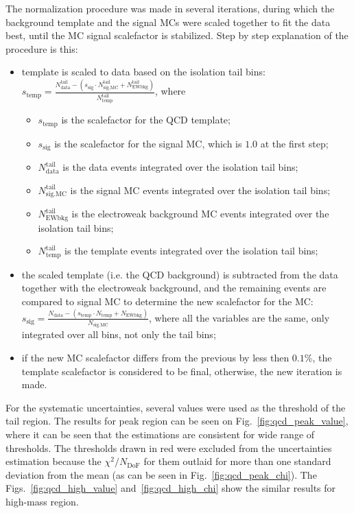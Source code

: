 The normalization procedure was made in several iterations, during which the background template and the signal MCs were scaled together to fit the data best, until the MC signal scalefactor is stabilized. Step by step explanation of the procedure is this:
\begin{itemize}
\item template is scaled to data based on the isolation tail bins: $s_{\mathrm{temp}} = \frac{N_{\mathrm{data}}^{\mathrm{tail}} - (s_{\mathrm{sig}} \cdot N_{\mathrm{sig.MC}}^{\mathrm{tail}}+N_{\mathrm{EWbkg}}^{\mathrm{tail}})}{N_{\mathrm{temp}}^{\mathrm{tail}}}$, where
\begin{itemize}
\item $s_{\mathrm{temp}}$ is the scalefactor for the QCD template;
\item $s_{\mathrm{sig}}$ is the scalefactor for the signal MC, which is $1.0$ at the first step;
\item $N_{\mathrm{data}}^{\mathrm{tail}}$ is the data events integrated over the isolation tail bins;
\item $N_{\mathrm{sig.MC}}^{\mathrm{tail}}$ is the signal MC events integrated over the isolation tail bins;
\item $N_{\mathrm{EWbkg}}^{\mathrm{tail}}$ is the electroweak background MC events integrated over the isolation tail bins;
\item $N_{\mathrm{temp}}^{\mathrm{tail}}$ is the template events integrated over the isolation tail bins;
\end{itemize}
\item the scaled template (i.e. the QCD background) is subtracted from the data together with the electroweak background, and the remaining events are compared to signal MC to determine the new scalefactor for the MC: $s_{\mathrm{sig}} = \frac{N_{\mathrm{data}} - (s_{\mathrm{temp}} \cdot N_{\mathrm{temp}} + N_{\mathrm{EWbkg}})}{N_{\mathrm{sig.MC}}}$, where all the variables are the same, only integrated over all bins, not only the tail bins;
\item if the new MC scalefactor differs from the previous by less then $0.1$\%, the template scalefactor is considered to be final, otherwise, the new iteration is made.
\end{itemize}

For the systematic uncertainties, several values were used as the threshold of the tail region. The results for peak region can be seen on Fig.~\ref{fig:qcd_peak_value}, where it can be seen that the estimations are consistent for wide range of thresholds. The thresholds drawn in red were excluded from the uncertainties estimation because the $\chi^2/N_\mathrm{DoF}$ for them outlaid for more than one standard deviation from the mean (as can be seen in Fig.~\ref{fig:qcd_peak_chi}). The Figs.~\ref{fig:qcd_high_value} and~\ref{fig:qcd_high_chi} show the similar results for high-mass region.

